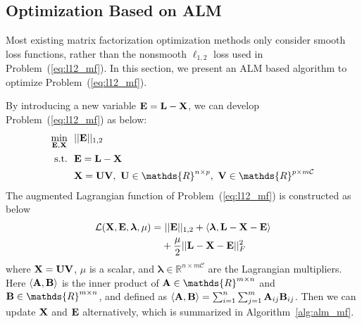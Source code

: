 \documentclass[letterpaper]{article}
\def\bA{{\bf A}}
\def\bB{{\bf B}}
\def\bE{{\bf E}}
\def\blambda{{\bm \lambda}}
\def\calL{{\mathcal{L}}}
\def\calC{{\mathcal{C}}}
\def\bL{{\bf L}}
\def\bU{{\bf U}}
\def\bV{{\bf V}}
\def\dsR{\mathds{R}}
\def\bX{{\bf X}}
\def\bA{{\bf A}}
\def\bX{{\bf X}}
\def\st{{\text{s.t.}}}
\begin{document}
\subsection{Optimization Based on ALM}

Most existing matrix factorization optimization methods only consider smooth loss functions, rather than the nonsmooth $\ell_{1,2}$ loss used in Problem~(\ref{eq:l12_mf}).
In this section, we present an ALM based algorithm to optimize Problem~(\ref{eq:l12_mf}).



By introducing a new variable $\bE = \bL - \bX$, we can develop Problem~(\ref{eq:l12_mf}) as below:
\begin{align}\label{eq:mf_l21_constrained}
  \min_{\bE, \bX} ~&~ || \bE ||_{1,2}   \nonumber \\
  \st             ~&~ \bE = \bL - \bX   \nonumber \\
                  ~&~ \bX = \bU \bV,~\bU \in \dsR^{n \times p},~\bV \in \dsR^{p \times m \calC}
\end{align}
The augmented Lagrangian function of Problem~(\ref{eq:l12_mf}) is constructed as below
\begin{align}\label{eq:lagrangian_l21}
  \calL (\bX, \bE, \blambda, \mu) = &~ || \bE ||_{1,2} + \langle \blambda, \bL - \bX - \bE \rangle      \nonumber \\
                                    & + \frac{\mu}{2} || \bL - \bX - \bE ||_F^2
\end{align}
\noindent
where $\bX = \bU \bV$, $\mu$ is a scalar,
and $\blambda \in \dsR^{n \times m\calC}$ are the Lagrangian multipliers.
Here $\langle \bA, \bB \rangle$ is the inner product of $\bA \in \dsR^{m \times n}$ and $\bB \in \dsR^{m \times n}$, and defined as $\langle \bA, \bB \rangle = \sum_{i=1}^{n} \sum_{j=1}^{m} \bA_{ij} \bB_{ij}$.
Then we can update $\bX$ and $\bE$ alternatively, which is summarized in Algorithm~\ref{alg:alm_mf}.
\end{document}
